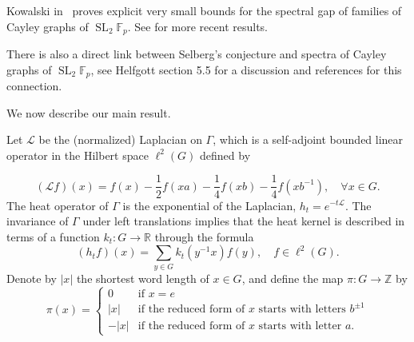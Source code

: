 \documentclass[11pt]{amsart}
\newcommand{\Z}{\mathbb{Z}}
\newcommand{\R}{\mathbb{R}}
\theoremstyle{definition}
\theoremstyle{remark}
\theoremstyle{plain}
\numberwithin{equation}{section}
\numberwithin{lemma}{section}
\numberwithin{definition}{section}
\numberwithin{proposition}{section}
\numberwithin{corollary}{section}
\numberwithin{theorem}{section}
\numberwithin{remark}{section}
\begin{document}
Kowalski in~\cite{MR3144176} proves explicit very small bounds for the spectral gap of families of Cayley graphs of $\operatorname{SL}_2 \mathbb{F}_p$. See \cite{MR4418463} for more recent results.

There is also a direct link between Selberg's conjecture and spectra of Cayley graphs of $\operatorname{SL}_2 \mathbb{F}_p$, see Helfgott \cite{MR3348442} section 5.5 for a discussion and references for this connection.

We now describe our main result.

Let $\mathcal{L}$ be the (normalized) Laplacian on $\Gamma$, which is a self-adjoint bounded linear operator in the Hilbert space $\ell^2(G)$ defined by

\begin{equation}\label{Laplacian_G}
(\mathcal{L} f)(x)=f(x)-\frac{1}{2}f(xa)-\frac{1}{4}f(xb)-\frac{1}{4}f(xb^{-1}),\quad \forall x\in G.
\end{equation}
The heat operator of $\Gamma$ is the exponential of the Laplacian, $h_t=e^{-t\mathcal{L}}$. The invariance of $\Gamma$ under left translations implies that
the heat kernel is described in terms of a function $k_t\colon G\to \R$ through the formula
\begin{equation}\label{heat_kernel_det}
(h_tf)(x)=\sum_{y\in G}k_t(y^{-1}x)f(y),\quad f\in \ell^2(G).
\end{equation}
Denote by $|x|$  the shortest word length of $x\in G$, and define the map
$\pi\colon G\to\Z$
by 
\begin{equation}\label{CY_proj}
 \pi(x)=
\begin{cases} 
0 & \text{if $x=e$} \\
 |x| & \text{if the reduced form of $x$ starts with letters $b^{\pm1}$} \\
 -|x| & \text{if the reduced form of $x$ starts with letter $a$}.
\end{cases}
\end{equation}
\end{document}
